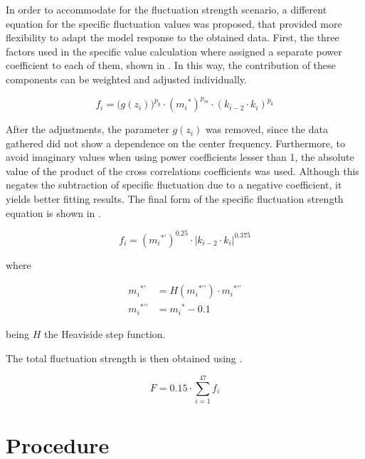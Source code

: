 \documentclass[../main.tex]{subfiles}
\begin{document}
\begin{modelchapter}
In order to accommodate for the fluctuation strength scenario, a different
equation for the specific fluctuation values was proposed, that provided more
flexibility to adapt the model response to the obtained data. First, the three
factors used in the specific value calculation where assigned a separate power
coefficient to each of them, shown in . In this way, the
contribution of these components can be weighted and adjusted individually.

\begin{equation}
  f_i = \big(g(z_i)\big)^{p_g} \cdot ({m_i}^*)^{p_m}
    \cdot (k_{i-2} \cdot k_i)^{p_k}
  \label{eq:fi}
\end{equation}

After the adjustments, the parameter $g(z_i)$ was removed, since the data
gathered did not show a dependence on the center frequency. Furthermore, to
avoid imaginary values when using power coefficients lesser than 1, the absolute
value of the product of the cross correlations coefficients was used. Although
this negates the subtraction of specific fluctuation due to a negative
coefficient, it yields better fitting results. The final form of the specific
fluctuation strength equation is shown in .

\begin{equation}
  f_i = ({m_i}^{*\prime})^{0.25} \cdot |k_{i-2} \cdot k_i|^{0.375}
  \label{eq:fi_final}
\end{equation}

where

\begin{align}
  {m_i}^{*\prime} &= H({m_i}^{*\prime\prime}) \cdot {m_i}^{*\prime\prime}
  \label{eq:md_transformation_1} \\
  {m_i}^{*\prime\prime} &= {m_i}^* - 0.1
  \label{eq:md_transformation_2}
\end{align}

being $H$ the Heaviside step function.

The total fluctuation strength is then obtained using
.

\begin{equation}
  F = 0.15 \cdot \displaystyle\sum_{i=1}^{47} f_i
  \label{eq:total_fluctuation}
\end{equation}

\section{Procedure}


\end{modelchapter}
\end{document}
